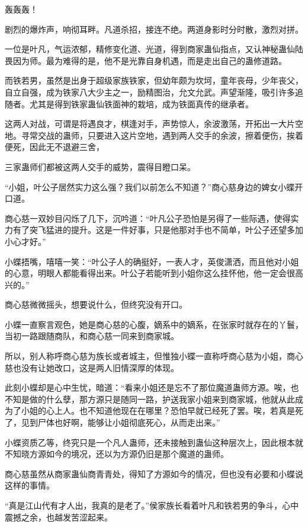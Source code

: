 
\begin{this_body}

轰轰轰！

剧烈的爆炸声，响彻耳畔。凡道杀招，接连不绝。两道身影时分时散，激烈对拼。

一位是叶凡，气运浓郁，精修变化道、光道，得到商家蛊仙指点，又认神秘蛊仙陆畏因为师。最为难得的是，他不是光靠自身机遇，而是走出自己的蛊修道路。

而铁若男，虽然是出身于超级家族铁家，但幼年颇为坎坷，童年丧母，少年丧父，自立自强，成为铁家八大少主之一，励精图治，允文允武。声望渐隆，吸引许多追随者。尤其是得到铁家蛊仙铁面神的栽培，成为铁面真传的继承者。

这两人对战，可谓是将遇良才，棋逢对手，声势惊人，余波激荡，开拓出一大片空地。寻常交战的蛊师，只要进入这片空地，遇到两人交手的余波，擦着便伤，挨着便死，因此无不退避三舍，

三家蛊师们都被这两人交手的威势，震得目瞪口呆。

“小姐，叶公子居然实力这么强？我们以前怎么不知道？”商心慈身边的婢女小蝶开口道。

商心慈一双妙目闪烁了几下，沉吟道：“叶凡公子恐怕是另得了一些际遇，使得实力有了突飞猛进的提升。这是一件好事，只是他那对手也不简单，叶公子还望多加小心才好。”

小蝶捂嘴，嘻嘻一笑：“叶公子人的确挺好，一表人才，英俊潇洒，而且他对小姐的心意，明眼人都能看得出来。叶公子若能听到小姐你这么挂怀他，他一定会很高兴的。”

商心慈微微摇头，想要说什么，但终究没有开口。

小蝶一直察言观色，她是商心慈的心腹，嫡系中的嫡系，在张家时就存在的丫鬟，当初一路跟随商队，和商心慈一同来到商家城。

所以，别人称呼商心慈为族长或者城主，但惟独小蝶一直称呼商心慈为小姐，商心慈也没有让她改口，这是两人旧情深厚的体现。

此刻小蝶却是心中生忧，暗道：“看来小姐还是忘不了那位魔道蛊师方源。唉，也不知是做的什么孽，那方源只是随同一路，护送我家小姐来到商家城，他就从此成为了小姐的心上人。也不知道他现在在哪里？恐怕早就已经死了罢。唉，若真是死了，见到尸体也好啊，能够让小姐彻底死心，从而走出来。”

小蝶资质乙等，终究只是一个凡人蛊师，还未接触到蛊仙这种层次上，因此根本就不知晓方源如今的境况，还以为方源仍旧是那个魔道的蛊师。

商心慈虽然从商家蛊仙商青青处，得知了方源如今的情况，但也没有必要和小蝶说这样的事情。

“真是江山代有才人出，我真的是老了。”侯家族长看着叶凡和铁若男的争斗，心中震撼之余，也越发苦涩起来。


\end{this_body}
